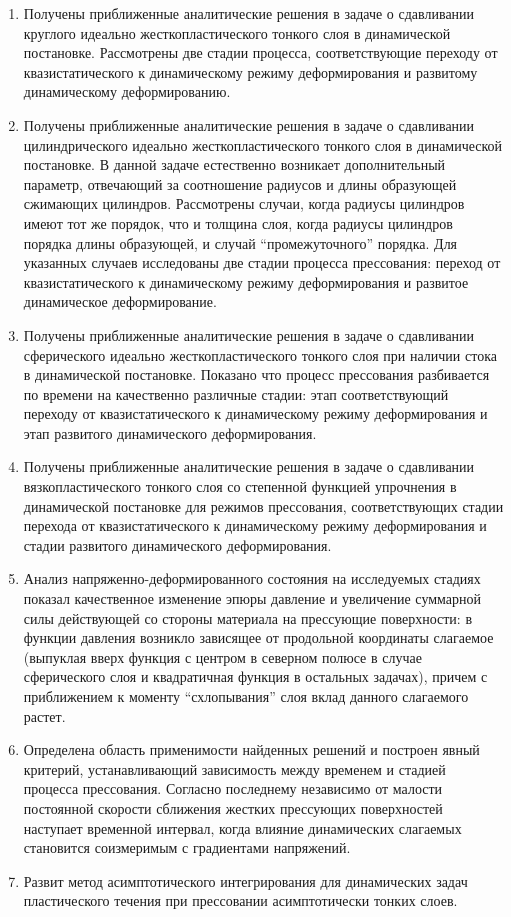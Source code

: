 \begin{enumerate}
  \item Получены приближенные аналитические решения в задаче о сдавливании круглого идеально жесткопластического тонкого слоя в динамической постановке. Рассмотрены две стадии процесса, соответствующие переходу от квазистатического к динамическому режиму деформирования и развитому динамическому деформированию.
  \item Получены приближенные аналитические решения в задаче о сдавливании цилиндрического идеально жесткопластического тонкого слоя в динамической постановке. В данной задаче естественно возникает дополнительный параметр, отвечающий за соотношение радиусов и длины образующей сжимающих цилиндров. Рассмотрены случаи, когда радиусы цилиндров имеют тот же порядок, что и толщина слоя, когда радиусы цилиндров порядка длины образующей, и случай ``промежуточного'' порядка. Для указанных случаев исследованы две стадии процесса прессования: переход от квазистатического к динамическому режиму деформирования и развитое динамическое деформирование.
  \item Получены приближенные аналитические решения в задаче о сдавливании сферического идеально жесткопластического тонкого слоя при наличии стока в динамической постановке. Показано что процесс прессования разбивается по времени на качественно различные стадии: этап соответствующий переходу от квазистатического к динамическому режиму деформирования и этап развитого динамического деформирования.
  \item Получены приближенные аналитические решения в задаче о сдавливании вязкопластического тонкого слоя со степенной функцией упрочнения в динамической постановке для режимов прессования, соответствующих стадии перехода от квазистатического к динамическому режиму деформирования и стадии развитого динамического деформирования.
  \item Анализ напряженно-деформированного состояния на исследуемых стадиях показал качественное изменение эпюры давление и увеличение суммарной силы действующей со стороны материала на прессующие поверхности: в функции давления возникло зависящее от продольной координаты слагаемое (выпуклая вверх функция с центром в северном полюсе в случае сферического слоя и квадратичная функция в остальных задачах), причем с приближением к моменту ``схлопывания'' слоя вклад данного слагаемого растет.
  \item Определена область применимости найденных решений и построен явный критерий, устанавливающий зависимость между временем и стадией процесса прессования. Согласно последнему независимо от малости постоянной скорости сближения жестких прессующих поверхностей наступает временной интервал, когда влияние динамических слагаемых становится соизмеримым с градиентами напряжений.
  \item Развит метод асимптотического интегрирования для динамических задач пластического течения при прессовании асимптотически тонких слоев.
\end{enumerate}
